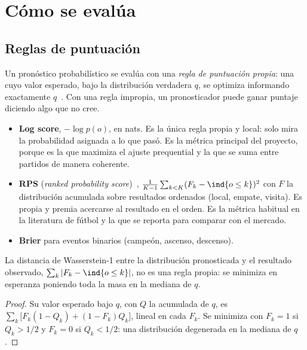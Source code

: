 \chapter{Cómo se evalúa}
\label{cap:eval}

\section{Reglas de puntuación}

Un pronóstico probabilístico se evalúa con una \emph{regla de puntuación propia}: una cuyo valor esperado, bajo la distribución verdadera $q$, se optimiza informando exactamente $q$~\cite{gneiting2007}. Con una regla impropia, un pronosticador puede ganar puntaje diciendo algo que no cree.

\begin{itemize}
\item \textbf{Log score}, $-\log p(o)$, en nats. Es la única regla propia y local: solo mira la probabilidad asignada a lo que pasó. Es la métrica principal del proyecto, porque es la que maximiza el ajuste prequential y la que se suma entre partidos de manera coherente.
\item \textbf{RPS} (\emph{ranked probability score})~\cite{epstein1969,constantinou2012}, $\frac{1}{K-1}\sum_{k<K}(F_k-\ind\{o\le k\})^2$ con $F$ la distribución acumulada sobre resultados ordenados (local, empate, visita). Es propia y premia acercarse al resultado en el orden. Es la métrica habitual en la literatura de fútbol y la que se reporta para comparar con el mercado.
\item \textbf{Brier} para eventos binarios (campeón, ascenso, descenso).
\end{itemize}

\begin{proposicion} \dem
La distancia de Wasserstein-1 entre la distribución pronosticada y el resultado observado, $\sum_k|F_k-\ind\{o\le k\}|$, no es una regla propia: se minimiza en esperanza poniendo toda la masa en la mediana de $q$.
\end{proposicion}

\begin{proof}
Su valor esperado bajo $q$, con $Q$ la acumulada de $q$, es $\sum_k\big[F_k(1-Q_k)+(1-F_k)Q_k\big]$, lineal en cada $F_k$. Se minimiza con $F_k=1$ si $Q_k>1/2$ y $F_k=0$ si $Q_k<1/2$: una distribución degenerada en la mediana de $q$.
\end{proof}

